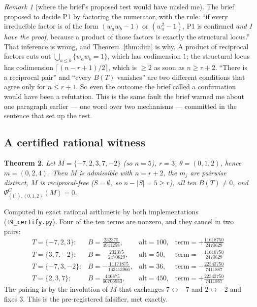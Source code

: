 \documentclass[11pt]{article}
\newtheorem{theorem}{Theorem}
\theoremstyle{definition}
\theoremstyle{remark}
\newtheorem{remark}[theorem]{Remark}
\newcommand{\PsiC}{\Psi^{C}}
\begin{document}
\begin{remark}[where the brief's proposed test would have misled me]
The brief proposed to decide P1 by factoring the numerator, with the rule: ``if
every irreducible factor is of the form $(w_aw_b-1)$ or $(w_a^2-1)$, P1 is
confirmed \emph{and I have the proof}, because a product of those factors is
exactly the structural locus.'' That inference is wrong, and
Theorem~\ref{thm:dim} is why. A product of reciprocal factors cuts out
$\bigcup_{a\le b}\{w_aw_b=1\}$, which has codimension $1$; the structural locus
has codimension $\lceil (n-r+1)/2\rceil$, which is $\ge2$ as soon as
$n\ge r+2$. ``There is a reciprocal pair'' and ``every $B(T)$ vanishes'' are two
different conditions that agree only for $n\le r+1$. So even the outcome the brief
called a confirmation would have been a refutation. This is the same fault the
brief warned me about one paragraph earlier --- one word over two mechanisms ---
committed in the sentence that set up the test.
\end{remark}

\subsection{A certified rational witness}

\begin{theorem}\label{thm:witness}
Let $M=\{-7,2,3,7,-2\}$ (so $n=5$), $r=3$, $\theta=(0,1,2)$, hence
$m=(0,2,4)$. Then $M$ is admissible with $n=r+2$, the $m_j$ are pairwise
distinct, $M$ is reciprocal-free ($S=\emptyset$, so $n-|S|=5\ge r$), all ten
$B(T)\ne0$, and $\PsiC_{(1^3),(0,1,2)}(M)=0$.
\end{theorem}

Computed in exact rational arithmetic by both implementations
(\texttt{t9\_certify.py}). Four of the ten terms are nonzero, and they cancel in
two pairs:
\[
\begin{array}{llll}
 T=\{-7,2,3\}: & B=\tfrac{232375}{4941258}, & \text{alt}=100,
   & \text{term}=+\tfrac{11618750}{2470629}\\[2pt]
 T=\{3,7,-2\}: & B=-\tfrac{232375}{2470629}, & \text{alt}=50,
   & \text{term}=-\tfrac{11618750}{2470629}\\[2pt]
 T=\{-7,3,-2\}: & B=-\tfrac{11171875}{133413966}, & \text{alt}=36,
   & \text{term}=-\tfrac{22343750}{7411887}\\[2pt]
 T=\{2,3,7\}: & B=\tfrac{446875}{66706983}, & \text{alt}=450,
   & \text{term}=+\tfrac{22343750}{7411887}
\end{array}
\]
The pairing is by the involution of $M$ that exchanges $7\leftrightarrow-7$ and
$2\leftrightarrow-2$ and fixes $3$. This is the pre-registered falsifier, met
exactly.
\end{document}
